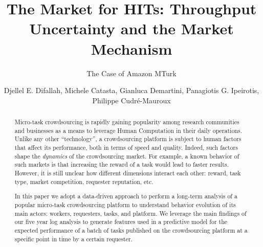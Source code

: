 \documentclass{sig-alternate}
\begin{document}
%

\title{The Market for HITs: Throughput Uncertainty and the Market Mechanism}
\subtitle{The Case of Amazon MTurk}


\author{Djellel E. Difallah, Michele Catasta, Gianluca Demartini, Panagiotis G. Ipeirotis, Philippe Cudr\'e-Mauroux}

\maketitle
\begin{abstract}
Micro-task crowdsourcing is rapidly gaining popularity among research communities and businesses as a means to leverage Human Computation in their daily operations. Unlike any other ``technology'', a crowdsourcing platform is subject to human factors that affect its performance, both in terms of speed and quality. Indeed, such factors shape the \emph{dynamics} of the crowdsourcing market. For example, a known behavior of such markets is that increasing the reward of a task would lead to faster results. However, it is still unclear how different dimensions interact each other: reward, task type, market competition, requester reputation, etc.

In this paper we adopt a data-driven approach to perform a long-term analysis of a popular micro-task crowdsourcing platform to understand behavior evolution of its main actors: workers, requesters, tasks, and platform. We leverage the main findings of our five year log analysis to generate features used in a predictive model for the expected performance of a batch of tasks published on the crowdsourcing platform at a specific point in time by a certain requester.
\end{abstract}
\end{document}
